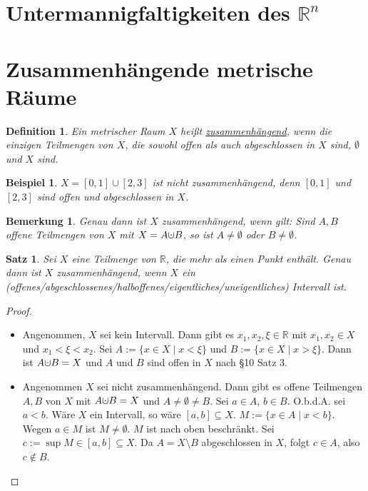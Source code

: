 \documentclass[10pt,a4paper]{report}
\newtheorem{satz}{Satz}
\newtheorem*{defi}{Definition}
\newtheorem*{remark}{Bemerkung}
\newtheorem*{example}{Beispiel}
\newcommand{\dotcup}{\ensuremath{\mathaccent\cdot\cup}}
\begin{document}
\section{Untermannigfaltigkeiten des $\mathbb{R}^{n}$}

\section{Zusammenhängende metrische Räume}

\begin{defi}
  Ein metrischer Raum $X$ heißt \underline{zusammenhängend}, wenn die einzigen Teilmengen von $X$, die sowohl offen als auch abgeschlossen in $X$ sind, $\emptyset$ und $X$ sind.
\end{defi}

\begin{example}
  $X = [0, 1] \cup [2, 3]$ ist nicht zusammenhängend, denn $[0, 1]$ und $[2, 3]$ sind offen und abgeschlossen in $X$.
\end{example}

\begin{remark}
  Genau dann ist $X$ zusammenhängend, wenn gilt:
  Sind $A, B$ offene Teilmengen von $X$ mit $X = A \dotcup B$, so ist $A \ne \emptyset$ oder $B \ne \emptyset$.
\end{remark}

\begin{satz}
  Sei $X$ eine Teilmenge von $\mathbb{R}$, die mehr als einen Punkt enthält.
  Genau dann ist $X$ zusammenhängend, wenn $X$ ein (offenes/abgeschlossenes/halboffenes/eigentliches/uneigentliches) Intervall ist.
\end{satz}

\begin{proof}
  \begin{itemize}
  \item Angenommen, $X$ sei kein Intervall.
    Dann gibt es $x_{1}, x_{2}, \xi \in \mathbb{R}$ mit $x_{1}, x_{2} \in X$ und $x_{1} < \xi < x_{2}$.
    Sei $A := \{ x \in X \mid x < \xi \}$ und $B := \{ x \in X \mid x > \xi \}$.
    Dann ist $A \dotcup B = X$ und $A$ und $B$ sind offen in $X$ nach §10 Satz 3.
  \item Angenommen $X$ sei nicht zusammenhängend.
    Dann gibt es offene Teilmengen $A, B$ von $X$ mit $A \dotcup B = X$ und $A \ne \emptyset \ne B$.
    Sei $a \in A$, $b \in B$.
    O.b.d.A. sei $a < b$.
    Wäre $X$ ein Intervall, so wäre $[a, b] \subseteq X$.
    $M := \{ x \in A \mid x < b \}$.
    Wegen $a \in M$ ist $M \ne \emptyset$.
    $M$ ist nach oben beschränkt.
    Sei $c := \sup M \in [a, b] \subseteq X$.
    Da $A = X \setminus B$ abgeschlossen in $X$, folgt $c \in A$, also $c \notin B$.
  \end{itemize}
\end{proof}
\end{document}
